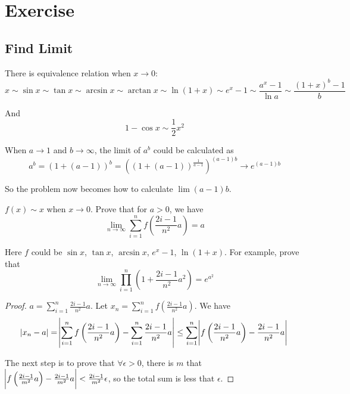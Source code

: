 \chapter{Exercise}


\section{Find Limit}

\begin{theorem}
    There is equivalence relation when $x \rightarrow 0$:
    \begin{equation}
        x \sim \sin x \sim \tan x \sim \arcsin x \sim \arctan x \sim \ln (1+x) \sim e^x -1 \sim \frac{a^x - 1}{\ln a} \sim \frac{(1+x)^b -1}{b}
    \end{equation}
    
    And 
    \begin{equation}
        1 - \cos x \sim \frac{1}{2} x^2
    \end{equation}
\end{theorem}

\begin{example}
    When $a \rightarrow 1$ and $b \rightarrow \infty$, the limit of $a^b$ could be calculated as
    \begin{equation}
        a^b = (1 + (a-1))^b = \left(\left(1 + (a-1)\right)^{\frac{1}{a-1}}\right)^{(a-1)b} \rightarrow e^{(a-1)b}
    \end{equation}
    
    So the problem now becomes how to calculate $\lim (a-1)b$.
\end{example}


\begin{theorem}
    $f(x) \sim x$ when $x \rightarrow 0$. Prove that for $a > 0$, we have
    \begin{equation}
        \lim_{n \rightarrow \infty} \sum_{i=1}^n f\left ( \frac{2i-1}{n^2} a \right ) = a
    \end{equation}
    
    Here $f$ could be $\sin x$, $\tan x$, $\arcsin x$, $e^x -1$, $\ln (1+x)$. For example, prove that
    \begin{equation}
        \lim_{n \rightarrow \infty} \prod_{i=1}^n \left( 1 + \frac{2i-1}{n^2} a^2 \right) = e^{a^2}
    \end{equation}
\end{theorem}
\begin{proof}
    $a = \sum_{i=1}^n \frac{2i-1}{n^2} a$. Let $x_n = \sum_{i=1}^n f\left( \frac{2i-1}{n^2} a \right)$. We have
    \begin{equation*}
        \abs{x_n - a} = \abs{ \sum_{i=1}^n f\left( \frac{2i-1}{n^2} a \right) - \sum_{i=1}^n \frac{2i-1}{n^2} a} \leq \sum_{i=1}^n \abs{ f\left( \frac{2i-1}{n^2} a \right) - \frac{2i-1}{n^2} a}
    \end{equation*}
    
    The next step is to prove that $\forall \epsilon > 0$, there is $m$ that $\abs{ f\left( \frac{2i-1}{m^2} a \right) - \frac{2i-1}{m^2} a} < \frac{2i-1}{m^2} \epsilon$, so the total sum is less that $\epsilon$.
\end{proof}

